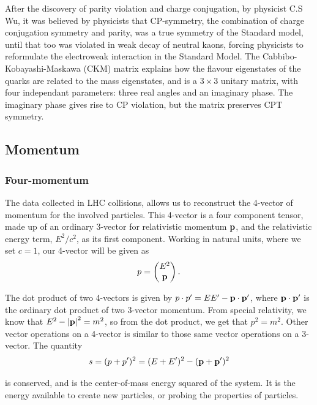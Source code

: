 \documentclass[12pt,a4paper]{article}
\numberwithin{equation}{section}
\begin{document}
After the discovery of parity violation and charge conjugation, by physicist C.S
Wu\cite{PhysRev.105.1413}, it was believed by physicists that CP-symmetry, the
combination of charge conjugation symmetry and parity, was a true symmetry of
the Standard model, until that too was violated in weak decay of neutral kaons,
forcing physicists to reformulate the electroweak interaction in the Standard
Model. The Cabbibo-Kobayashi-Maskawa (CKM) matrix explains how the flavour
eigenstates of the quarks are related to the mass eigenstates, and is a $3 \times 3$
unitary matrix, with four independant parameters: three real angles and an
imaginary phase\cite[153]{Povh2015}. The imaginary phase gives rise to CP
violation, but the matrix preserves CPT symmetry.

\subsection{Momentum}\label{sec:momentum}

\subsubsection{Four-momentum}
The data collected in LHC collisions, allows us to reconstruct the 4-vector of
momentum for the involved particles. This 4-vector is a four component tensor,
made up of an ordinary 3-vector for relativistic momentum $\vb p$, and the
relativistic energy term, $E^2/c^2$, as its first component. Working in natural
units, where we set $c=1$, our 4-vector will be given as
\begin{equation}
p = \left(\begin{matrix} E^2 \\ \vb p \end{matrix} \right).
\end{equation}

The dot product of two 4-vectors is given by $p\cdot p' = E E' - \vb p \cdot \vb{p'}$,
where $\vb p \cdot \vb{p'}$ is the ordinary dot product of two 3-vector momentum.
From special relativity, we know that $E^2 - \abs{\vb p}^2 = m^2$, so from the
dot product, we get that $p^2 = m^2$. Other vector operations on a 4-vector is
similar to those same vector operations on a 3-vector. The quantity
\begin{equation}
s = (p + p')^2 = (E + E')^2 - (\vb p + \vb p')^2
\end{equation}

is conserved, and is the center-of-mass energy squared of the system. It is the
energy available to create new particles, or probing the properties of
particles.
\end{document}
